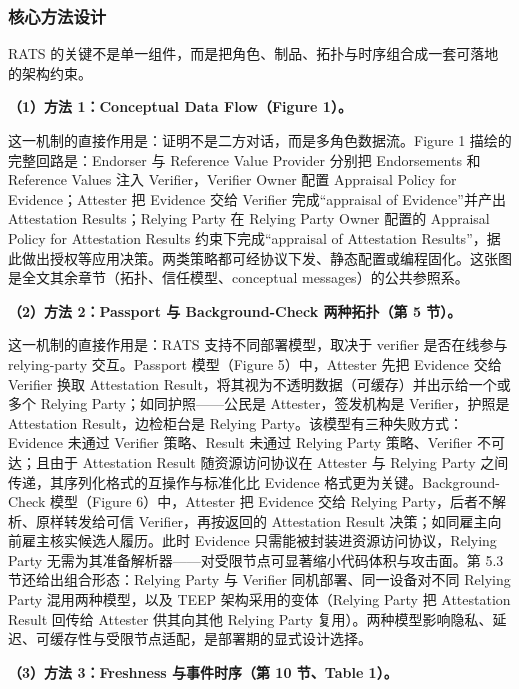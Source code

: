 \documentclass[11pt]{ctexart}
\begin{document}
\subsubsection{核心方法设计}
RATS 的关键不是单一组件，而是把角色、制品、拓扑与时序组合成一套可落地的架构约束。\par
\noindent\textbf{（1）方法 1：Conceptual Data Flow（Figure 1）。}\par
这一机制的直接作用是：证明不是二方对话，而是多角色数据流。Figure 1 描绘的完整回路是：Endorser 与 Reference Value Provider 分别把 Endorsements 和 Reference Values 注入 Verifier，Verifier Owner 配置 Appraisal Policy for Evidence；Attester 把 Evidence 交给 Verifier 完成“appraisal of Evidence”并产出 Attestation Results；Relying Party 在 Relying Party Owner 配置的 Appraisal Policy for Attestation Results 约束下完成“appraisal of Attestation Results”，据此做出授权等应用决策。两类策略都可经协议下发、静态配置或编程固化。这张图是全文其余章节（拓扑、信任模型、conceptual messages）的公共参照系。\par
\noindent\textbf{（2）方法 2：Passport 与 Background-Check 两种拓扑（第 5 节）。}\par
这一机制的直接作用是：RATS 支持不同部署模型，取决于 verifier 是否在线参与 relying-party 交互。Passport 模型（Figure 5）中，Attester 先把 Evidence 交给 Verifier 换取 Attestation Result，将其视为不透明数据（可缓存）并出示给一个或多个 Relying Party；如同护照——公民是 Attester，签发机构是 Verifier，护照是 Attestation Result，边检柜台是 Relying Party。该模型有三种失败方式：Evidence 未通过 Verifier 策略、Result 未通过 Relying Party 策略、Verifier 不可达；且由于 Attestation Result 随资源访问协议在 Attester 与 Relying Party 之间传递，其序列化格式的互操作与标准化比 Evidence 格式更为关键。Background-Check 模型（Figure 6）中，Attester 把 Evidence 交给 Relying Party，后者不解析、原样转发给可信 Verifier，再按返回的 Attestation Result 决策；如同雇主向前雇主核实候选人履历。此时 Evidence 只需能被封装进资源访问协议，Relying Party 无需为其准备解析器——对受限节点可显著缩小代码体积与攻击面。第 5.3 节还给出组合形态：Relying Party 与 Verifier 同机部署、同一设备对不同 Relying Party 混用两种模型，以及 TEEP 架构采用的变体（Relying Party 把 Attestation Result 回传给 Attester 供其向其他 Relying Party 复用）。两种模型影响隐私、延迟、可缓存性与受限节点适配，是部署期的显式设计选择。\par
\noindent\textbf{（3）方法 3：Freshness 与事件时序（第 10 节、Table 1）。}\par
\end{document}
